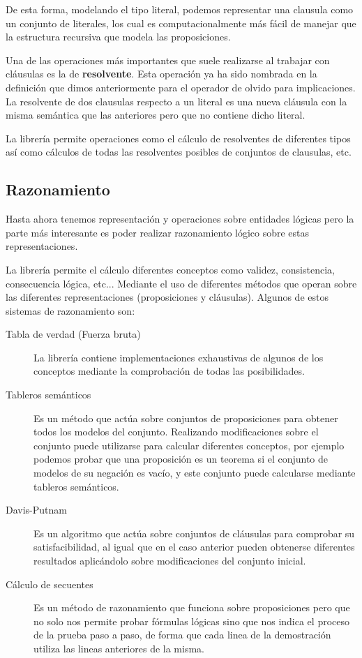 	De esta forma, modelando el tipo literal, podemos representar una clausula como un conjunto de literales, los cual es computacionalmente más fácil de manejar que la estructura recursiva que modela las proposiciones.
	
	Una de las operaciones más importantes que suele realizarse al trabajar con cláusulas es la de \textbf{resolvente}. Esta operación ya ha sido nombrada en la definición que dimos anteriormente para el operador de olvido para implicaciones. La resolvente de dos clausulas respecto a un literal es una nueva cláusula con la misma semántica que las anteriores pero que no contiene dicho literal. 
	
	La librería permite operaciones como el cálculo de resolventes de diferentes tipos así como cálculos de todas las resolventes posibles de conjuntos de clausulas, etc.
	

\subsection*{Razonamiento}

	Hasta ahora tenemos representación y operaciones sobre entidades lógicas pero la parte más interesante es poder realizar razonamiento lógico sobre estas representaciones.	
	
	La librería permite el cálculo diferentes conceptos como validez, consistencia, consecuencia lógica, etc... Mediante el uso de diferentes métodos que operan sobre las diferentes representaciones (proposiciones y cláusulas). Algunos de estos sistemas de razonamiento son:
	
	\begin{description}
		\item[Tabla de verdad (Fuerza bruta)] La librería contiene implementaciones exhaustivas de algunos de los conceptos mediante la comprobación de todas las posibilidades.
		\item[Tableros semánticos] Es un método que actúa sobre conjuntos de proposiciones para obtener todos los modelos del conjunto. Realizando modificaciones sobre el conjunto puede utilizarse para calcular diferentes conceptos, por ejemplo podemos probar que una proposición es un teorema si el conjunto de modelos de su negación es vacío, y este conjunto puede calcularse mediante tableros semánticos.
		\item[Davis-Putnam] Es un algoritmo que actúa sobre conjuntos de cláusulas para comprobar su satisfacibilidad, al igual que en el caso anterior pueden obtenerse diferentes resultados aplicándolo sobre modificaciones del conjunto inicial.
		\item[Cálculo de secuentes] Es un método de razonamiento que funciona sobre proposiciones pero que no solo nos permite probar fórmulas lógicas sino que nos indica el proceso de la prueba paso a paso, de forma que cada linea de la demostración utiliza las lineas anteriores de la misma.
	\end{description}

